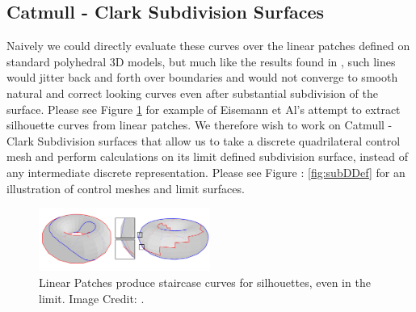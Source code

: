 \documentclass[12pt, letterpaper]{article}
\begin{document}
	
	
	\subsection{Catmull - Clark Subdivision Surfaces}
	
		Naively we could directly evaluate these curves over the linear patches defined on standard polyhedral 3D models,
		but much like the results found in \cite{Eisemann08},
		such lines would jitter back and forth over boundaries and would not converge to smooth natural and correct looking curves even after substantial
		subdivision of the surface. Please see Figure \ref{fig:Eisemann_linear_patches} for example of Eisemann et Al's attempt to extract silhouette
		curves from linear patches. We therefore wish to work on Catmull - Clark Subdivision surfaces that allow us to take a discrete quadrilateral control mesh
		and perform calculations on its limit defined subdivision surface, instead of any intermediate discrete representation.
		Please see Figure : \ref{fig:subDDef} for an illustration of control meshes and limit surfaces.

		\begin{figure}[h]
		\centering
		\includegraphics[width=0.5\textwidth]{Eisemann08_linear_patches}
		\caption{Linear Patches produce staircase curves for silhouettes, even in the limit. Image Credit: \cite{Eisemann08}.}
		\label{fig:Eisemann_linear_patches}
		\end{figure}
\end{document}
